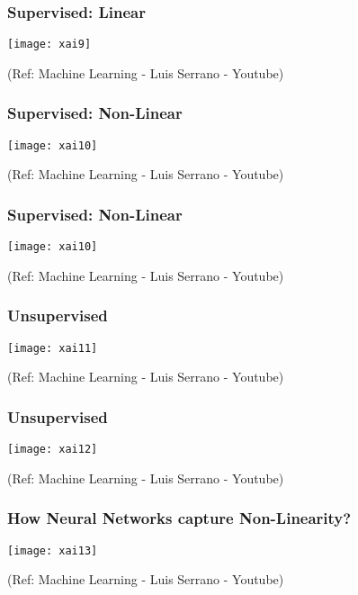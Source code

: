 \begin{frame}[fragile]\frametitle{Supervised: Linear}
\begin{center}
\texttt{[image: xai9]}
\end{center}

\tiny{(Ref: Machine Learning - Luis Serrano - Youtube)}
\end{frame}

\begin{frame}[fragile]\frametitle{Supervised: Non-Linear}
\begin{center}
\texttt{[image: xai10]}
\end{center}

\tiny{(Ref: Machine Learning - Luis Serrano - Youtube)}
\end{frame}

\begin{frame}[fragile]\frametitle{Supervised: Non-Linear}
\begin{center}
\texttt{[image: xai10]}
\end{center}

\tiny{(Ref: Machine Learning - Luis Serrano - Youtube)}
\end{frame}

\begin{frame}[fragile]\frametitle{Unsupervised}
\begin{center}
\texttt{[image: xai11]}
\end{center}

\tiny{(Ref: Machine Learning - Luis Serrano - Youtube)}
\end{frame}

\begin{frame}[fragile]\frametitle{Unsupervised}
\begin{center}
\texttt{[image: xai12]}
\end{center}

\tiny{(Ref: Machine Learning - Luis Serrano - Youtube)}
\end{frame}

\begin{frame}[fragile]\frametitle{How Neural Networks capture Non-Linearity?}
\begin{center}
\texttt{[image: xai13]}
\end{center}

\tiny{(Ref: Machine Learning - Luis Serrano - Youtube)}
\end{frame}

